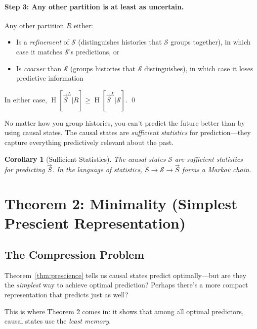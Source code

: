 \documentclass[11pt,a4paper]{article}
\theoremstyle{definition}
\theoremstyle{plain}
\newtheorem{corollary}[theorem]{Corollary}
\newcommand{\calS}{\mathcal{S}}
\newcommand{\Past}{\overleftarrow{S}}
\newcommand{\Future}{\overrightarrow{S}}
\DeclareMathOperator{\Ent}{H}
\begin{document}
\paragraph{Step 3: Any other partition is at least as uncertain.}
Any other partition $R$ either:
\begin{itemize}[nosep]
    \item Is a \emph{refinement} of $\calS$ (distinguishes histories that $\calS$ groups together), in which case it matches $\calS$'s predictions, or
    \item Is \emph{coarser} than $\calS$ (groups histories that $\calS$ distinguishes), in which case it loses predictive information
\end{itemize}
In either case, $\Ent[\Future^L | R] \geq \Ent[\Future^L | \calS]$. \qed

\begin{intuition}
No matter how you group histories, you can't predict the future better than by using causal states. The causal states are \emph{sufficient statistics} for prediction---they capture everything predictively relevant about the past.
\end{intuition}

\begin{corollary}[Sufficient Statistics]
The causal states $\calS$ are sufficient statistics for predicting $\Future$. In the language of statistics, $\Past \to \calS \to \Future$ forms a Markov chain.
\end{corollary}

\section{Theorem 2: Minimality (Simplest Prescient Representation)}
\label{sec:theorem-minimality}

\subsection{The Compression Problem}

Theorem~\ref{thm:prescience} tells us causal states predict optimally---but are they the \emph{simplest} way to achieve optimal prediction? Perhaps there's a more compact representation that predicts just as well?

This is where Theorem 2 comes in: it shows that among all optimal predictors, causal states use the \emph{least memory}.
\end{document}
